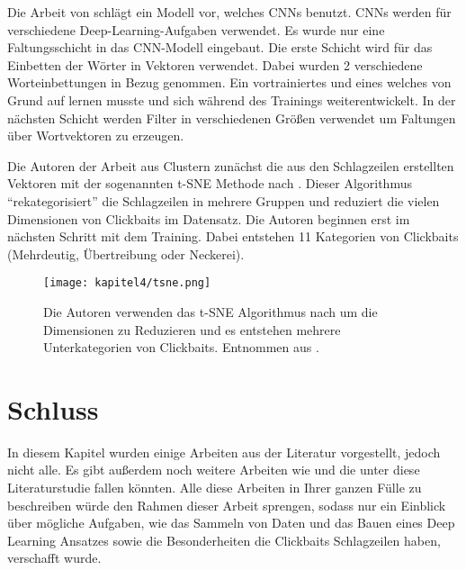 Die Arbeit von \cite*{Agrawal2017} schlägt ein Modell vor, welches CNNs benutzt. CNNs werden für verschiedene Deep-Learning-Aufgaben verwendet. Es wurde nur eine Faltungsschicht in das CNN-Modell eingebaut. Die erste Schicht wird für das Einbetten der Wörter in Vektoren verwendet. Dabei wurden 2 verschiedene Worteinbettungen in Bezug genommen. Ein vortrainiertes und eines welches von Grund auf lernen musste und sich während des Trainings weiterentwickelt. In der nächsten Schicht werden Filter in verschiedenen Größen verwendet um Faltungen über Wortvektoren zu erzeugen.

Die Autoren der Arbeit aus \cite*{Pujahari} Clustern zunächst die aus den Schlagzeilen erstellten Vektoren mit der sogenannten t-SNE Methode nach \cite{VanDerMaaten2008}. Dieser Algorithmus \enquote{rekategorisiert} die Schlagzeilen in mehrere Gruppen und reduziert die vielen Dimensionen von Clickbaits im Datensatz. Die Autoren beginnen erst im nächsten Schritt mit dem Training. Dabei entstehen 11 Kategorien von Clickbaits (Mehrdeutig, Übertreibung oder Neckerei).


\begin{figure}[H]
    \centering
    \texttt{[image: kapitel4/tsne.png]}
    \caption[Clustering von Überschriften mit t-SNE]{Die Autoren verwenden das t-SNE Algorithmus nach \cite{VanDerMaaten2008} um die Dimensionen zu Reduzieren und es entstehen mehrere Unterkategorien von Clickbaits. Entnommen aus \cite*{Pujahari}.}
    \label{TSNE}
\end{figure}

\section{Schluss}
In diesem Kapitel wurden einige Arbeiten aus der Literatur vorgestellt, jedoch nicht alle. Es gibt außerdem noch weitere Arbeiten wie \cite*{chawda2019novel}\cite*{Zannettou2018}\cite*{Kumar}\cite*{Thomas}\cite*{Liao}\cite*{Glenski} und \cite*{Biyani2016} die unter diese Literaturstudie fallen könnten. Alle diese Arbeiten in Ihrer ganzen Fülle zu beschreiben würde den Rahmen dieser Arbeit sprengen, sodass nur ein Einblick über mögliche Aufgaben, wie das Sammeln von Daten und das Bauen eines Deep Learning Ansatzes sowie die Besonderheiten die Clickbaits Schlagzeilen haben, verschafft wurde.




